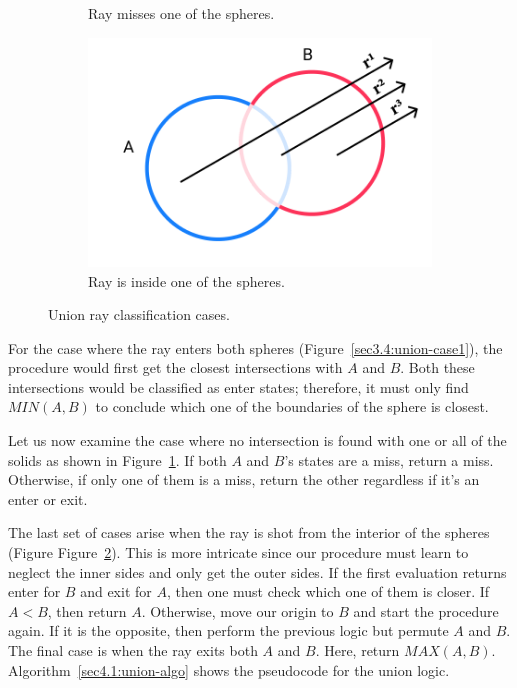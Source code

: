 \documentclass[a4paper,11pt,oneside]{article}
\begin{document}
\begin{figure}[ht]
\begin{subfigure}[b]{0.3\textwidth}
		\caption{Ray misses one of the spheres.}
		\label{sec3.4:union-case2}
	\end{subfigure}
	\hfill
	\begin{subfigure}[b]{0.3\textwidth}
		\centering
		\includegraphics[width=\textwidth]{section4/4.1/union-case-2.png}
		\caption{Ray is inside one of the spheres.}
		\label{sec3.4:union-case3}
	\end{subfigure}
	\caption{Union ray classification cases.}
	\label{sec3.4:sphere-union}
\end{figure}

For the case where the ray enters both spheres (Figure~\ref{sec3.4:union-case1}), the procedure would first get the closest intersections with $A$ and $B$. Both these intersections would be classified as enter states; therefore, it must only find $MIN(A, B)$ to conclude which one of the boundaries of the sphere is closest.

Let us now examine the case where no intersection is found with one or all of the solids as shown in Figure~\ref{sec3.4:union-case2}. If both $A$ and $B$'s states are a miss, return a miss. Otherwise, if only one of them is a miss, return the other regardless if it's an enter or exit.

The last set of cases arise when the ray is shot from the interior of the spheres (Figure Figure~\ref{sec3.4:union-case3}). This is more intricate since our procedure must learn to neglect the inner sides and only get the outer sides. If the first evaluation returns enter for $B$ and exit for $A$, then one must check which one of them is closer. If $A < B$, then return $A$. Otherwise, move our origin to $B$ and start the procedure again. If it is the opposite, then perform the previous logic but permute $A$ and $B$. The final case is when the ray exits both $A$ and $B$. Here, return $MAX(A, B)$. Algorithm~\ref{sec4.1:union-algo} shows the pseudocode for the union logic.
\end{document}

